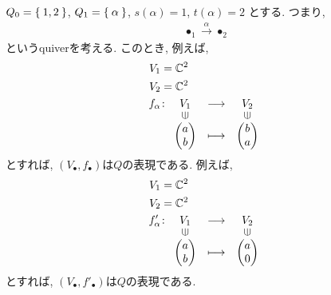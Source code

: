 \begin{example}
  $Q_0=\Set{1,2}$,
  $Q_1=\Set{\alpha}$,
  $s(\alpha)=1$,
  $t(\alpha)=2$
  とする.
  つまり,
  \begin{align*}
    \bullet_{1} \xrightarrow{\alpha} \bullet_{2}
  \end{align*}
  というquiverを考える.
  このとき,
  例えば,
  \begin{align*}
    V_1&=\CC^2\\
    V_2&=\CC^2\\
    f_\alpha&\colon
    \Shazo{V_1}{V_2}
    {\begin{pmatrix}a\\b\end{pmatrix}}
    {\begin{pmatrix}b\\a\end{pmatrix}}
  \end{align*}
  とすれば,
  $(V_\bullet,f_\bullet)$は$Q$の表現である.
  例えば,
  \begin{align*}
    V_1&=\CC^2\\
    V_2&=\CC^2\\
    f'_\alpha&\colon
    \Shazo{V_1}{V_2}
    {\begin{pmatrix}a\\b\end{pmatrix}}
    {\begin{pmatrix}a\\0\end{pmatrix}}
  \end{align*}
  とすれば,
  $(V_\bullet,f'_\bullet)$は$Q$の表現である.
\end{example}


